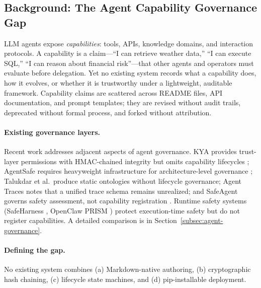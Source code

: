 \subsection{Background: The Agent Capability Governance Gap}\label{subsec:background}

LLM agents expose \emph{capabilities}: tools, APIs, knowledge domains, and interaction protocols. A capability is a claim---``I can retrieve weather data,'' ``I can execute SQL,'' ``I can reason about financial risk''---that other agents and operators must evaluate before delegation. Yet no existing system records what a capability does, how it evolves, or whether it is trustworthy under a lightweight, auditable framework. Capability claims are scattered across README files, API documentation, and prompt templates; they are revised without audit trails, deprecated without formal process, and forked without attribution.

\paragraph{Existing governance layers.} Recent work addresses adjacent aspects of agent governance. KYA provides trust-layer permissions with HMAC-chained integrity but omits capability lifecycles \cite{kya2025}; AgentSafe requires heavyweight infrastructure for architecture-level governance \cite{agentsafe2025}; Talukdar et al.\ produce static ontologies without lifecycle governance; Agent Traces notes that a unified trace schema remains unrealized; and SafeAgent governs safety assessment, not capability registration \cite{talukdar2025,agenttraces2025,safeagent2025}. Runtime safety systems (SafeHarness \cite{safeharness2026}, OpenClaw PRISM \cite{openclaw_prism2026}) protect execution-time safety but do not register capabilities. A detailed comparison is in Section~\ref{subsec:agent-governance}.

\paragraph{Defining the gap.} No existing system combines (a) Markdown-native authoring, (b) cryptographic hash chaining, (c) lifecycle state machines, and (d) pip-installable deployment.

